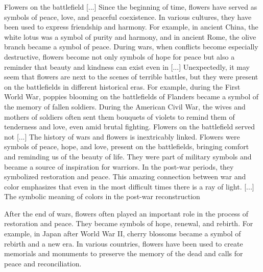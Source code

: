 \documentclass[12pt]{article}
\begin{document}
Flowers on the battlefield [...] Since the beginning of time, flowers have served as symbols of peace, love, and peaceful coexistence. In various cultures, they have been used to express friendship and harmony. For example, in ancient China, the white lotus was a symbol of purity and harmony, and in ancient Rome, the olive branch became a symbol of peace. During wars, when conflicts become especially destructive, flowers become not only symbols of hope for peace but also a reminder that beauty and kindness can exist even in [...] Unexpectedly, it may seem that flowers are next to the scenes of terrible battles, but they were present on the battlefields in different historical eras. For example, during the First World War, poppies blooming on the battlefields of Flanders became a symbol of the memory of fallen soldiers. During the American Civil War, the wives and mothers of soldiers often sent them bouquets of violets to remind them of tenderness and love, even amid brutal fighting. Flowers on the battlefield served not [...] The history of wars and flowers is inextricably linked. Flowers were symbols of peace, hope, and love, present on the battlefields, bringing comfort and reminding us of the beauty of life. They were part of military symbols and became a source of inspiration for warriors. In the post-war periods, they symbolized restoration and peace. This amazing connection between war and color emphasizes that even in the most difficult times there is a ray of light. [...] The symbolic meaning of colors in the post-war reconstruction

After the end of wars, flowers often played an important role in the process of restoration and peace. They became symbols of hope, renewal, and rebirth. For example, in Japan after World War II, cherry blossoms became a symbol of rebirth and a new era. In various countries, flowers have been used to create memorials and monuments to preserve the memory of the dead and calls for peace and reconciliation.
\end{document}
